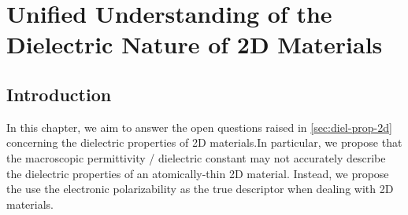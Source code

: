 \chapter{Unified Understanding of the Dielectric Nature of 2D Materials}
\label{ch:diel}
\renewcommand*\imgdir{img/diel/}

%

\vspace{1em}


\section{Introduction}
\label{sec:diel-introduction}

In this chapter, we aim to answer the open questions raised in
\autoref{sec:diel-prop-2d} concerning the dielectric properties of 2D
materials.In particular, we propose that the macroscopic permittivity
/ dielectric constant may not accurately describe the dielectric
properties of an atomically-thin 2D material. Instead, we propose the
use the electronic polarizability as the true descriptor when dealing
with 2D materials.


